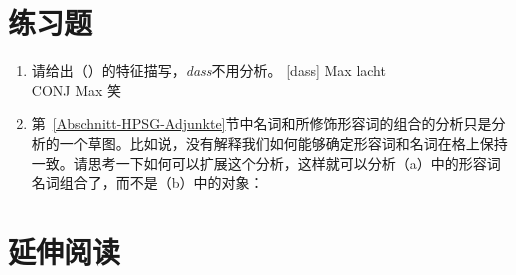 \section*{练习题}

\begin{enumerate}
\item 请给出（）的特征描写，\emph{dass}不用分析。
\ea
\gll {}[dass] Max lacht\\
	 {}\spacebr{}CONJ Max 笑\\
\z
\item 第~\ref{Abschnitt-HPSG-Adjunkte}节中名词和所修饰形容词的组合的分析只是分析的一个草图。比如说，没有解释我们如何能够确定形容词和名词在格上保持一致。请思考一下如何可以扩展这个分析，这样就可以分析（a）中的形容词名词组合了，而不是（b）中的对象：
\eal
{}
\zl

\end{enumerate}



\section*{延伸阅读}


